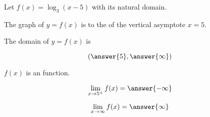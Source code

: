 \documentclass{ximera}
\author{Lee Wayand}
\begin{document}
\begin{exercise}






Let $f(x) = \log_3(x-5)$ with its natural domain. \\





\begin{question}


The graph of $y = f(x)$ is to the  of the vertical asymptote $x = 5$.


\end{question}





\begin{question}


The domain of $y = f(x)$ is 

\[
\left( \answer{5}, \answer{\infty} \right)
\]


\end{question}






\begin{question}


$f(x)$ is an  function.


\end{question}











\begin{question}


\[
\lim\limits_{x \to 5^+} f(x) = \answer{-\infty}
\]


\end{question}








\begin{question}


\[
\lim\limits_{x \to \infty} f(x) = \answer{\infty}
\]


\end{question}










\end{exercise}
\end{document}
